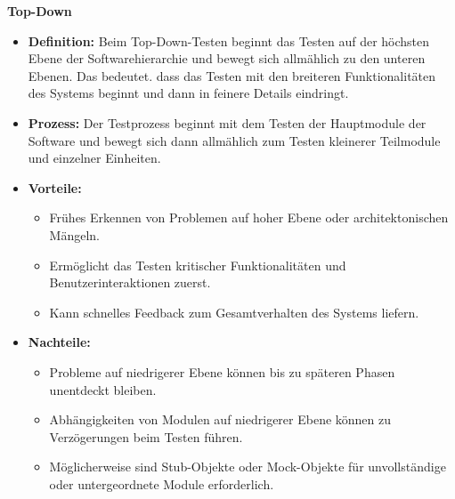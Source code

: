\textbf{Top-Down}
\begin{itemize}
	\item \textbf{Definition:} Beim Top-Down-Testen beginnt das Testen auf der höchsten Ebene der Softwarehierarchie und bewegt sich allmählich zu den unteren Ebenen. Das bedeutet. dass das Testen mit den breiteren Funktionalitäten des Systems beginnt und dann in feinere Details eindringt.
	\item \textbf{Prozess:} Der Testprozess beginnt mit dem Testen der Hauptmodule der Software und bewegt sich dann allmählich zum Testen kleinerer Teilmodule und einzelner Einheiten.
	\item \textbf{Vorteile:}
	\begin{itemize}
		\item Frühes Erkennen von Problemen auf hoher Ebene oder architektonischen Mängeln.
		\item Ermöglicht das Testen kritischer Funktionalitäten und Benutzerinteraktionen zuerst.
		\item Kann schnelles Feedback zum Gesamtverhalten des Systems liefern.
	\end{itemize}
	\item \textbf{Nachteile:}
	\begin{itemize}
		\item Probleme auf niedrigerer Ebene können bis zu späteren Phasen unentdeckt bleiben.
		\item Abhängigkeiten von Modulen auf niedrigerer Ebene können zu Verzögerungen beim Testen führen.
		\item Möglicherweise sind Stub-Objekte oder Mock-Objekte für unvollständige oder untergeordnete Module erforderlich.
	\end{itemize}
\end{itemize}

